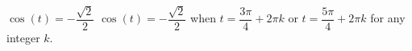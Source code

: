 {$\cos(t) = -\dfrac{\sqrt{2}}{2}$}
{$\cos(t) = -\dfrac{\sqrt{2}}{2}$ when $t = \dfrac{3\pi}{4} + 2\pi k$ or $t = \dfrac{5\pi}{4} + 2\pi k$ for any integer $k$.}
